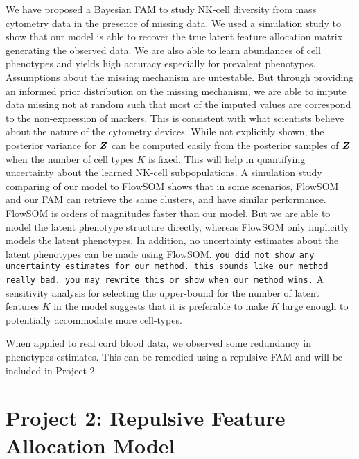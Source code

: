 \documentclass[12pt,]{article}
\newcommand{\bZ}{\mbox{\boldmath $Z$}}
\begin{document}
We have proposed a Bayesian FAM to study NK-cell diversity from mass cytometry
data in the presence of missing data. We used a simulation study to show that
our model is able to recover the true latent feature allocation matrix
generating the observed data. We are also able to learn  abundances of
cell phenotypes and yields high accuracy especially for prevalent phenotypes. %
%
Assumptions about the missing mechanism are untestable. But through providing
an informed prior distribution on the missing mechanism, we are able to impute
data missing not at random such that most of the imputed values are correspond
to the non-expression of markers. This is consistent with what scientists
believe about the nature of the cytometry devices.
%
While not explicitly shown, the posterior variance for $\bZ$ can be computed
easily from the posterior samples of $\bZ$ when the number of cell types $K$ is
fixed. This will help in quantifying uncertainty about the learned NK-cell
subpopulations. 
%
A simulation study comparing of our model to FlowSOM shows that in some
scenarios, FlowSOM and our FAM can retrieve the same clusters, and have similar
performance. FlowSOM is orders of magnitudes faster than our model.  But we are
able to model the latent phenotype structure directly, whereas FlowSOM only
implicitly models the latent phenotypes. In addition, no uncertainty estimates
about the latent phenotypes can be made using FlowSOM.
{\tt you did not show any uncertainty estimates for our method.  this sounds like our method really bad.  you may rewrite this or show when our method wins.}
%
A sensitivity analysis for selecting the upper-bound for the number of latent
features $K$ in the model suggests that it is preferable to make $K$ large
enough to potentially accommodate more cell-types.

When applied to real cord blood data, we observed some redundancy in phenotypes estimates. This can be remedied
using a repulsive FAM and will be included in Project 2.






\section{Project 2: Repulsive Feature Allocation Model}\label{sec:proj2}
\end{document}
